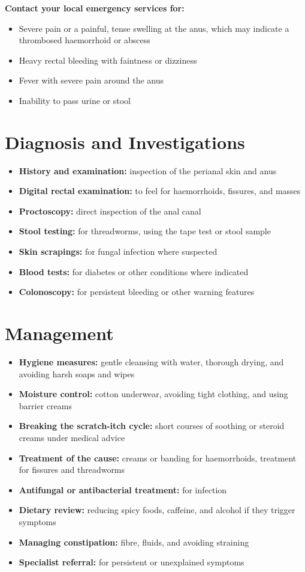 \textbf{Contact your local emergency services for:}
\begin{itemize}
    \item Severe pain or a painful, tense swelling at the anus, which may indicate a thrombosed haemorrhoid or abscess
    \item Heavy rectal bleeding with faintness or dizziness
    \item Fever with severe pain around the anus
    \item Inability to pass urine or stool
\end{itemize}

\section*{Diagnosis and Investigations}
\begin{itemize}
    \item \textbf{History and examination:} inspection of the perianal skin and anus
    \item \textbf{Digital rectal examination:} to feel for haemorrhoids, fissures, and masses
    \item \textbf{Proctoscopy:} direct inspection of the anal canal
    \item \textbf{Stool testing:} for threadworms, using the tape test or stool sample
    \item \textbf{Skin scrapings:} for fungal infection where suspected
    \item \textbf{Blood tests:} for diabetes or other conditions where indicated
    \item \textbf{Colonoscopy:} for persistent bleeding or other warning features
\end{itemize}

\section*{Management}
\begin{itemize}
    \item \textbf{Hygiene measures:} gentle cleansing with water, thorough drying, and avoiding harsh soaps and wipes
    \item \textbf{Moisture control:} cotton underwear, avoiding tight clothing, and using barrier creams
    \item \textbf{Breaking the scratch-itch cycle:} short courses of soothing or steroid creams under medical advice
    \item \textbf{Treatment of the cause:} creams or banding for haemorrhoids, treatment for fissures and threadworms
    \item \textbf{Antifungal or antibacterial treatment:} for infection
    \item \textbf{Dietary review:} reducing spicy foods, caffeine, and alcohol if they trigger symptoms
    \item \textbf{Managing constipation:} fibre, fluids, and avoiding straining
    \item \textbf{Specialist referral:} for persistent or unexplained symptoms
\end{itemize}

